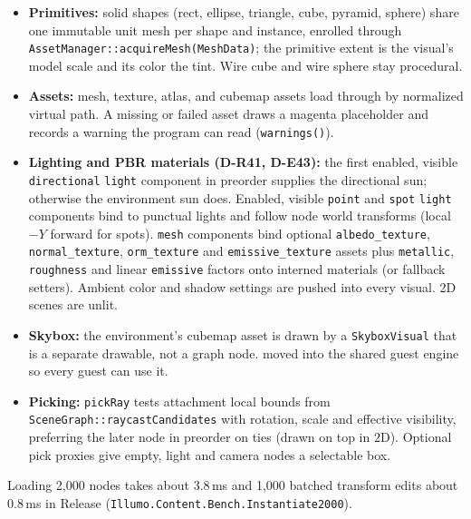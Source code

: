 \begin{itemize}
  \item \textbf{Primitives:} solid shapes (rect, ellipse, triangle, cube,
        pyramid, sphere) share one immutable unit mesh per shape and instance,
        enrolled through \texttt{AssetManager::acquireMesh(MeshData)}; the
        primitive extent is the visual's model scale and its color the tint.
        Wire cube and wire sphere stay procedural.
  \item \textbf{Assets:} mesh, texture, atlas, and cubemap assets load through
         by normalized virtual path. A missing or
        failed asset draws a magenta placeholder and records a warning the
        program can read (\texttt{warnings()}).
  \item \textbf{Lighting and PBR materials (D-R41, D-E43):} the first enabled,
        visible \texttt{directional} \texttt{light} component in preorder
        supplies the directional sun; otherwise the environment sun does.
        Enabled, visible \texttt{point} and \texttt{spot} \texttt{light}
        components bind to  punctual lights and follow
        node world transforms (local $-Y$ forward for spots).
        \texttt{mesh} components bind optional \texttt{albedo\_texture},
        \texttt{normal\_texture}, \texttt{orm\_texture} and
        \texttt{emissive\_texture} assets plus \texttt{metallic},
        \texttt{roughness} and linear \texttt{emissive} factors onto interned
         materials (or fallback 
        setters). Ambient color and shadow settings are pushed into every
        visual. 2D scenes are unlit.
  \item \textbf{Skybox:} the environment's cubemap asset is drawn by a
        \texttt{SkyboxVisual} that is a separate drawable, not a graph node.
         moved into the shared guest engine so
        every guest can use it.
  \item \textbf{Picking:} \texttt{pickRay} tests attachment local bounds from
        \texttt{SceneGraph::raycastCandidates} with rotation, scale and
        effective visibility, preferring the later node in preorder on ties
        (drawn on top in 2D). Optional pick proxies give empty, light and
        camera nodes a selectable box.
\end{itemize}
Loading 2,000 nodes takes about 3.8\,ms and 1,000 batched transform edits
about 0.8\,ms in Release (\texttt{Illumo.Content.Bench.Instantiate2000}).

